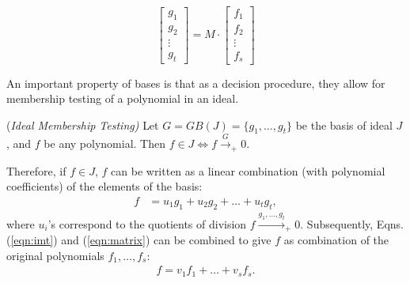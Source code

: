 \begin{equation}\label{eqn:matrix}
\begin{bmatrix} g_1 \\ g_2 \\ \vdots \\ g_t \end{bmatrix}  =  M \cdot
\begin{bmatrix} f_1 \\ f_2 \\ \vdots \\ f_s \end{bmatrix}
\end{equation}

An important property of \Grobner bases is that as a decision
procedure, they allow for membership testing of a polynomial in an
ideal. 

\begin{Proposition}
\label{prop:imt}
({\it Ideal Membership Testing)
} 
Let $G = GB(J) = \{g_1,\dots,g_t\}$ be the \Grobner basis of ideal
$J$, and $f$ be any polynomial. Then $f\in J \iff f\xrightarrow{G}_+0$.
\end{Proposition}

Therefore, if $f\in J$, $f$ can
be written as a linear combination (with polynomial coefficients) of
the elements of the \Grobner basis: 
\vspace{-0.1in}
\begin{align}\label{eqn:imt}
f & = u_1g_1 + u_2g_2+ \dots+ u_tg_t,
\end{align}
where $u_i$'s correspond to the quotients of division
$f\xrightarrow{g_1,\dots,g_t}_+0$. Subsequently, Eqns. (\ref{eqn:imt})
and (\ref{eqn:matrix}) can be combined to give $f$ as combination of
the original polynomials $f_1,\dots,f_s$:
\begin{align}\label{eqn:imt_orig}
f = v_1f_1 +\dots+v_sf_s.
\end{align}

